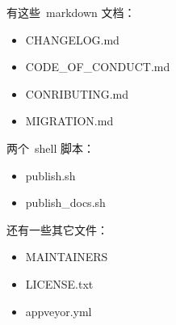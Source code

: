 
有这些\, markdown 文档：

\begin{itemize}
  \item CHANGELOG.md
  \item CODE\_OF\_CONDUCT.md
  \item CONRIBUTING.md
  \item MIGRATION.md
\end{itemize}


两个\, shell 脚本：

\begin{itemize}
  \item publish.sh
  \item publish\_docs.sh
\end{itemize}


还有一些其它文件：

\begin{itemize}
  \item MAINTAINERS
  \item LICENSE.txt
  \item appveyor.yml
\end{itemize}
